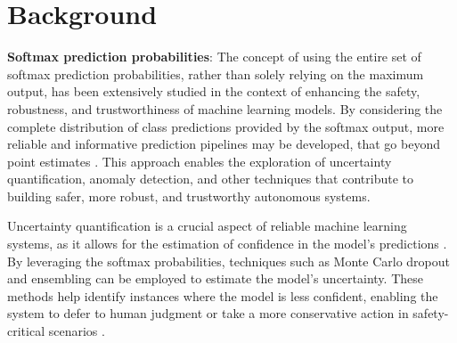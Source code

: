 
\section{Background}




\textbf{Softmax prediction probabilities}: The concept of using the entire set of softmax prediction probabilities, rather than solely relying on the maximum output, has been extensively studied in the context of enhancing the safety, robustness, and trustworthiness of machine learning models. By considering the complete distribution of class predictions provided by the softmax output, more reliable and informative prediction pipelines may be developed, that go beyond point estimates \cite{gal2016dropout}. This approach enables the exploration of uncertainty quantification, anomaly detection, and other techniques that contribute to building safer, more robust, and trustworthy autonomous systems.

Uncertainty quantification is a crucial aspect of reliable machine learning systems, as it allows for the estimation of confidence in the model's predictions \cite{kendall2017uncertainties}. By leveraging the softmax probabilities, techniques such as Monte Carlo dropout \cite{gal2016dropout} and ensembling \cite{lakshminarayanan2017simple} can be employed to estimate the model's uncertainty. These methods help identify instances where the model is less confident, enabling the system to defer to human judgment or take a more conservative action in safety-critical scenarios \cite{michelmore2018evaluating}.

